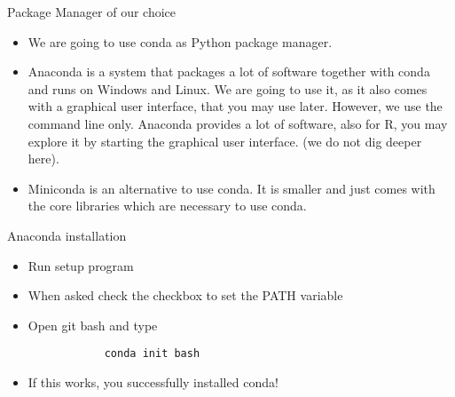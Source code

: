 \begin{frame}{Package Manager of our choice}
	
	\begin{itemize}
		\item We are going to use conda as Python package manager. 
		\item Anaconda is a system that packages a lot of software together with conda and runs on Windows and Linux. We are going to use it, as it also comes with a graphical user interface, that you may use later. However, we use the command line only. Anaconda provides a lot of software, also for R, you may explore it by starting the graphical user interface. (we do not dig deeper here).
		\item Miniconda is an alternative to use conda. It is smaller and just comes with the core libraries which are necessary to use conda.
		
	\end{itemize}
	
	
\end{frame}

\begin{frame}[fragile]{Anaconda installation}
		
		\begin{itemize}
		\item Run setup program
		\item When asked check the checkbox to set the PATH variable
		\item Open git bash and type
		
		\begin{verbatim}
			conda init bash
		\end{verbatim}
		\item If this works, you successfully installed conda!
		
		\end{itemize}
		
\end{frame}

